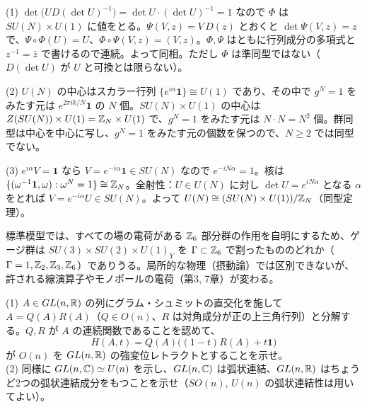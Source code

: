 \begin{solution}
(1) $\det\bigl(U D(\det U)^{-1}\bigr)=\det U\cdot(\det U)^{-1}=1$ なので $\Phi$ は $SU(N)\times U(1)$ に値をとる。$\Psi(V,z)=V\,D(z)$ とおくと $\det\Psi(V,z)=z$ で、$\Psi\circ\Phi(U)=U$、$\Phi\circ\Psi(V,z)=(V,z)$。$\Phi,\Psi$ はともに行列成分の多項式と $z^{-1}=\bar z$ で書けるので連続。よって同相。ただし $\Phi$ は準同型ではない（$D(\det U)$ が $U$ と可換とは限らない）。

(2) $U(N)$ の中心はスカラー行列 $\{e^{i\alpha}\mathbf 1\}\cong U(1)$ であり、その中で $g^N=1$ をみたす元は $e^{2\pi ik/N}\mathbf 1$ の $N$ 個。$SU(N)\times U(1)$ の中心は $Z(SU(N))\times U(1)=\mathbb{Z}_N\times U(1)$ で、$g^N=1$ をみたす元は $N\cdot N=N^2$ 個。群同型は中心を中心に写し、$g^N=1$ をみたす元の個数を保つので、$N\ge2$ では同型でない。

(3) $e^{i\alpha}V=\mathbf 1$ なら $V=e^{-i\alpha}\mathbf 1\in SU(N)$ なので $e^{-iN\alpha}=1$。核は $\{(\omega^{-1}\mathbf 1,\omega):\omega^N=1\}\cong\mathbb{Z}_N$。全射性：$U\in U(N)$ に対し $\det U=e^{iN\alpha}$ となる $\alpha$ をとれば $V=e^{-i\alpha}U\in SU(N)$。よって $U(N)\cong(SU(N)\times U(1))/\mathbb{Z}_N$（同型定理）。

標準模型では、すべての場の電荷がある $\mathbb{Z}_6$ 部分群の作用を自明にするため、ゲージ群は $SU(3)\times SU(2)\times U(1)_Y$ を $\Gamma\subset\mathbb{Z}_6$ で割ったもののどれか（$\Gamma=1,\mathbb{Z}_2,\mathbb{Z}_3,\mathbb{Z}_6$）でありうる。局所的な物理（摂動論）では区別できないが、許される線演算子やモノポールの電荷（第3, 7章）が変わる。
\end{solution}

\begin{problem}[難易度 C]\label{ch01-prob-gl}
(1) $A\in GL(n,\mathbb{R})$ の列にグラム・シュミットの直交化を施して $A=Q(A)R(A)$（$Q\in O(n)$、$R$ は対角成分が正の上三角行列）と分解する。$Q,R$ が $A$ の連続関数であることを認めて、
\[
H(A,t)=Q(A)\bigl((1-t)R(A)+t\mathbf 1\bigr)
\]
が $O(n)$ を $GL(n,\mathbb{R})$ の強変位レトラクトとすることを示せ。\\
(2) 同様に $GL(n,\mathbb{C})\simeq U(n)$ を示し、$GL(n,\mathbb{C})$ は弧状連結、$GL(n,\mathbb{R})$ はちょうど2つの弧状連結成分をもつことを示せ（$SO(n)$, $U(n)$ の弧状連結性は用いてよい）。
\end{problem}

